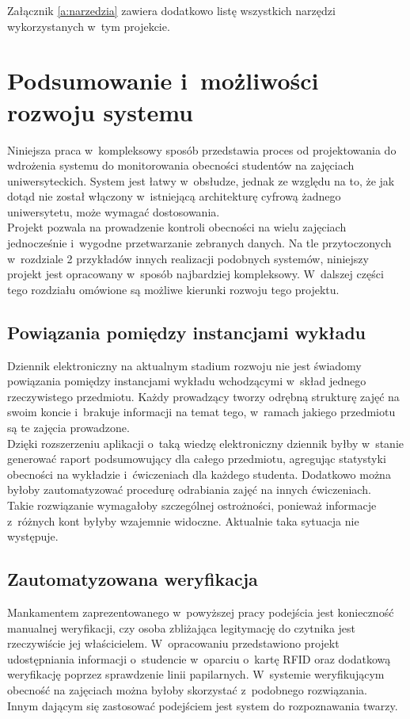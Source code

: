 \documentclass[declaration,shortabstract, mgr]{iithesis}
\begin{document}
Załącznik \ref{a:narzedzia} zawiera dodatkowo listę wszystkich narzędzi wykorzystanych w~tym projekcie.

\chapter{Podsumowanie i~możliwości rozwoju systemu}
\indent Niniejsza praca w~kompleksowy sposób przedstawia proces od projektowania do wdrożenia systemu do monitorowania obecności studentów na zajęciach uniwersyteckich. System jest łatwy w~obsłudze, jednak ze względu na to, że jak dotąd nie został włączony w~istniejącą architekturę cyfrową żadnego uniwersytetu, może wymagać dostosowania. \\
\indent Projekt pozwala na prowadzenie kontroli obecności na wielu zajęciach jednocześnie i~wygodne przetwarzanie zebranych danych. Na tle przytoczonych w~rozdziale 2 przykładów innych realizacji podobnych systemów, niniejszy projekt jest opracowany w~sposób najbardziej kompleksowy. W~dalszej części tego rozdziału omówione są możliwe kierunki rozwoju tego projektu.

\section{Powiązania pomiędzy instancjami wykładu}
\indent Dziennik elektroniczny na aktualnym stadium rozwoju nie jest świadomy powiązania pomiędzy instancjami wykładu wchodzącymi w~skład jednego rzeczywistego przedmiotu. Każdy prowadzący tworzy odrębną strukturę zajęć na swoim koncie i~brakuje informacji na temat tego, w~ramach jakiego przedmiotu są te zajęcia prowadzone. \\
\indent Dzięki rozszerzeniu aplikacji o~taką wiedzę elektroniczny dziennik byłby w~stanie generować raport podsumowujący dla całego przedmiotu, agregując statystyki obecności na wykładzie i~ćwiczeniach dla każdego studenta. Dodatkowo można byłoby zautomatyzować procedurę odrabiania zajęć na innych ćwiczeniach. \\
\indent Takie rozwiązanie wymagałoby szczególnej ostrożności, ponieważ informacje z~różnych kont byłyby wzajemnie widoczne. Aktualnie taka sytuacja nie występuje.
\section{Zautomatyzowana weryfikacja}
\indent Mankamentem zaprezentowanego w~powyższej pracy podejścia jest konieczność manualnej weryfikacji, czy osoba zbliżająca legitymację do czytnika jest rzeczywiście jej właścicielem. W~opracowaniu \cite{fingerprint} przedstawiono projekt udostępniania informacji o~studencie w~oparciu o~kartę RFID oraz dodatkową weryfikację poprzez sprawdzenie linii papilarnych. W~systemie weryfikującym obecność na zajęciach można byłoby skorzystać z~podobnego rozwiązania.\\
\indent Innym dającym się zastosować podejściem jest system do rozpoznawania twarzy.
\end{document}
